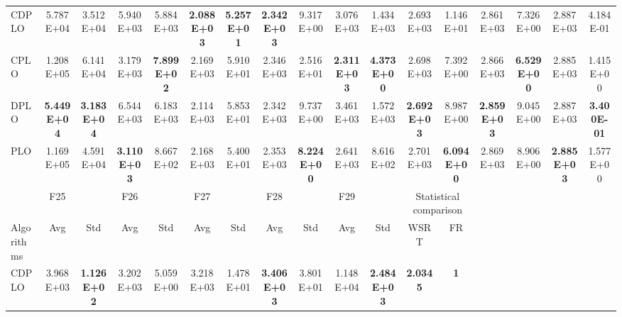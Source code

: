 \documentclass[review]{elsarticle}
\begin{document}
\begin{table}
\begin{tabular}{@{} lcccccccccccccccc @{}}
CDPLO      & 5.787E+04          & 3.512E+04          & 5.940E+03          & 5.884E+03          & \textbf{2.088E+03} & \textbf{5.257E+01} & \textbf{2.342E+03} & 9.317E+00          & 3.076E+03          & 1.434E+03          & 2.693E+03            & 1.146E+01           & 2.861E+03          & 7.326E+00          & 2.887E+03          & 4.184E-01          \\
CPLO       & 1.208E+05          & 6.141E+04          & 3.179E+03          & \textbf{7.899E+02} & 2.169E+03          & 5.910E+01          & 2.346E+03          & 2.516E+01          & \textbf{2.311E+03} & \textbf{4.373E+00} & 2.698E+03            & 7.392E+00           & 2.866E+03          & \textbf{6.529E+00} & 2.885E+03          & 1.415E+00          \\
DPLO       & \textbf{5.449E+04} & \textbf{3.183E+04} & 6.544E+03          & 6.183E+03          & 2.114E+03          & 5.853E+01          & 2.342E+03          & 9.737E+00          & 3.461E+03          & 1.572E+03          & \textbf{2.692E+03}   & 8.987E+00           & \textbf{2.859E+03} & 9.045E+00          & 2.887E+03          & \textbf{3.400E-01} \\
PLO        & 1.169E+05          & 4.591E+04          & \textbf{3.110E+03} & 8.667E+02          & 2.168E+03          & 5.400E+01          & 2.353E+03          & \textbf{8.224E+00} & 2.641E+03          & 8.616E+02          & 2.701E+03            & \textbf{6.094E+00}  & 2.869E+03          & 8.906E+00          & \textbf{2.885E+03} & 1.577E+00          \\
           & F25                &                    & F26                &                    & F27                &                    & F28                &                    & F29                &                    & \multicolumn{2}{c}{Statistical comparison} &                    &                    &                    &                    \\
Algorithms & Avg                & Std                & Avg                & Std                & Avg                & Std                & Avg                & Std                & Avg                & Std                & WSRT                 & FR                  &                    &                    &                    &                    \\
CDPLO      & 3.968E+03          & \textbf{1.126E+02} & 3.202E+03          & 5.059E+00          & 3.218E+03          & 1.478E+01          & \textbf{3.406E+03} & 3.801E+01          & 1.148E+04          & \textbf{2.484E+03} & \textbf{2.0345}      & \textbf{1}          &                    &                    &                    &                    \\

\end{tabular}
\end{table}
\end{document}

